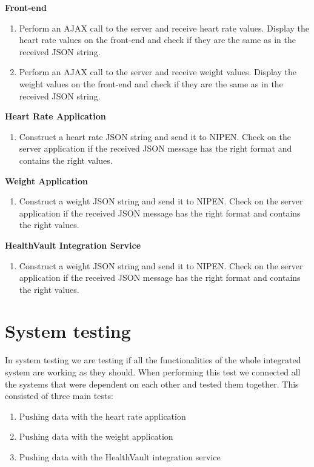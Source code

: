 \textbf{Front-end}
\begin{enumerate}
\item Perform an AJAX call to the server and receive heart rate values. Display the heart rate values on the front-end and check if they are the same as in the received JSON string.
\item Perform an AJAX call to the server and receive weight values. Display the weight values on the front-end and check if they are the same as in the received JSON string.
\end{enumerate}

\textbf{Heart Rate Application}
\begin{enumerate}
\item Construct a heart rate JSON string and send it to NIPEN. Check on the server application if the received JSON message has the right format and contains the right values.
\end{enumerate}

\textbf{Weight Application}
\begin{enumerate}
\item Construct a weight JSON string and send it to NIPEN. Check on the server application if the received JSON message has the right format and contains the right values.
\end{enumerate}

\textbf{HealthVault Integration Service}
\begin{enumerate}
\item Construct a weight JSON string and send it to NIPEN. Check on the server application if the received JSON message has the right format and contains the right values.
\end{enumerate}

\section{System testing}

In system testing we are testing if all the functionalities of the whole integrated system are working as they should.
When performing this test we connected all the systems that were dependent on each other and tested them together.
This consisted of three main tests:

\begin{enumerate}
\item Pushing data with the heart rate application
\item Pushing data with the weight application
\item Pushing data with the HealthVault integration service
\end{enumerate}

